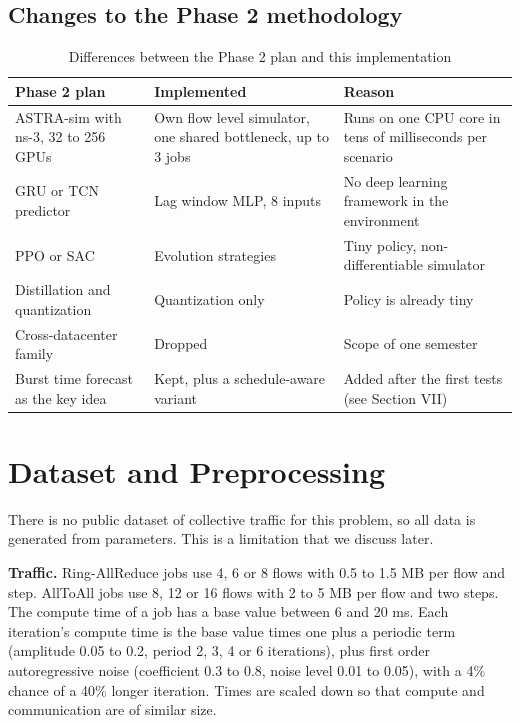 \documentclass[conference]{IEEEtran}
\begin{document}
\subsection{Changes to the Phase 2 methodology}
\begin{table}[t]
\centering
\caption{Differences between the Phase 2 plan and this implementation}
\label{tab:changes}
\scriptsize
\begin{tabular}{p{2.2cm}p{3.0cm}p{2.5cm}}
\toprule
\textbf{Phase 2 plan} & \textbf{Implemented} & \textbf{Reason} \\
\midrule
ASTRA-sim with ns-3, 32 to 256 GPUs & Own flow level simulator, one shared bottleneck, up to 3 jobs & Runs on one CPU core in tens of milliseconds per scenario \\
GRU or TCN predictor & Lag window MLP, 8 inputs & No deep learning framework in the environment \\
PPO or SAC & Evolution strategies & Tiny policy, non-differentiable simulator \\
Distillation and quantization & Quantization only & Policy is already tiny \\
Cross-datacenter family & Dropped & Scope of one semester \\
Burst time forecast as the key idea & Kept, plus a schedule-aware variant & Added after the first tests (see Section VII) \\
\bottomrule
\end{tabular}
\end{table}

\section{Dataset and Preprocessing}
There is no public dataset of collective traffic for this problem, so all data is generated from parameters. This is a limitation that we discuss later.

\textbf{Traffic.} Ring-AllReduce jobs use 4, 6 or 8 flows with 0.5 to 1.5 MB per flow and step. AllToAll jobs use 8, 12 or 16 flows with 2 to 5 MB per flow and two steps. The compute time of a job has a base value between 6 and 20 ms. Each iteration's compute time is the base value times one plus a periodic term (amplitude 0.05 to 0.2, period 2, 3, 4 or 6 iterations), plus first order autoregressive noise (coefficient 0.3 to 0.8, noise level 0.01 to 0.05), with a 4\% chance of a 40\% longer iteration. Times are scaled down so that compute and communication are of similar size.
\end{document}
